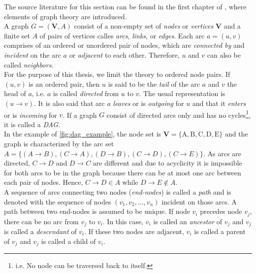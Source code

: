 
The source literature for this section can be found in the first chapter of \cite{nagarajan2013bayesian}, where elements of graph theory are introduced.
\\

A graph $G=(\mathbf{V}, A)$ consist of a non-empty set of \textit{nodes} or \textit{vertices} $\bm{V}$ and a finite set $A$ of pairs of vertices calles \textit{arcs}, \textit{links}, or \textit{edges}. Each arc $a=(u, v)$ comprises of an ordered or unordered pair of nodes, which are \textit{connected by} and \textit{incident} on the arc $a$ or \textit{adjacent} to each other. Therefore, $u$ and $v$ can also be called \textit{neighbors}. \\

For the purpose of this thesis, we limit the theory to ordered node pairs. If $(u,v)$ is an ordered pair, then $u$ is said to be the \textit{tail} of the arc $a$ and $v$ the head of $a$, i.e. $a$ is called \textit{directed} from $u$ to $v$. The usual representation is $(u \rightarrow v)$. It is also said that arc $a$ \textit{leaves} or is \textit{outgoing} for $u$ and that it \textit{enters} or is \textit{incoming} for $v$. If a graph $G$ consist of directed arcs only and has no cycles\footnote{i.e. No node can be traversed back to itself.}, it is called a \textit{\ac{DAG}}. \\ In the example of \autoref{fig:dag_example}, the node set is $\mathbf{V}=\{\mathrm{A}, \mathrm{B}, \mathrm{C}, \mathrm{D}, \mathrm{E}\}$ and the graph is characterized by the arc set $A=\{(A \rightarrow B),(C \rightarrow A),(D \rightarrow B),(C \rightarrow D),(C \rightarrow E)\}$. As arcs are directed, $C \rightarrow D$ and $D \rightarrow C$ are different and due to acyclicity it is impossible for both arcs to be in the graph because there can be at most one arc between each pair of nodes. Hence, $C \rightarrow D \in A$ while $D \rightarrow E \notin A$.
\\

A sequence of arcs connecting two nodes (\textit{end-nodes}) is called a \textit{path} and is denoted with the sequence of nodes $\left(v_{1}, v_{2}, \ldots, v_{n}\right)$ incident on those arcs. A path between two end-nodes is assumed to be unique. If node $v_i$ precedes node $v_j$, there can be no arc from $v_j$ to $v_i$. In this case, $v_i$ is called an \textit{ancestor} of $v_j$ and $v_j$ is called a \textit{descendant} of $v_i$. If these two nodes are adjacent, $v_i$ is called a parent of $v_j$ and $v_j$ is called a child of $v_i$.
\\

